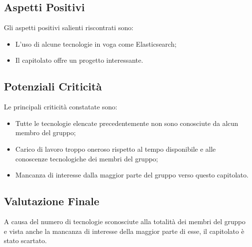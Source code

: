 \subsection{Aspetti Positivi}
Gli aspetti positivi salienti riscontrati sono:
\begin{itemize}
	\item L'uso di alcune tecnologie in voga come Elasticsearch;
	\item Il capitolato offre un progetto interessante.
\end{itemize}

\subsection{Potenziali Criticità}
Le principali criticità constatate sono:
\begin{itemize}
	\item Tutte le tecnologie elencate precedentemente non sono conosciute da alcun membro del gruppo;
	\item Carico di lavoro troppo oneroso rispetto al tempo disponibile e alle conoscenze tecnologiche dei membri del gruppo;
	\item Mancanza di interesse dalla maggior parte del gruppo verso questo capitolato.
\end{itemize}

\subsection{Valutazione Finale}
A causa del numero di tecnologie sconosciute alla totalità dei membri del gruppo e vista anche la mancanza di interesse della maggior parte di esse, il capitolato è stato scartato.
	